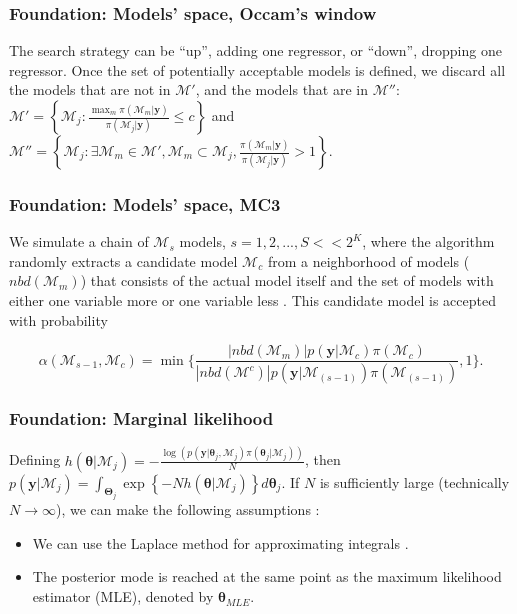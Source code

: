 \documentclass[12pt, compress]{beamer}
\begin{document}
\begin{frame}
	\frametitle{Foundation: Models' space, Occam's window}
The search strategy can be ``up'', adding one regressor, or ``down'', dropping one regressor. Once the set of potentially acceptable models is defined, we discard all the models that are not in $\mathcal{M}'$, and the models that are in $\mathcal{M}''$:
$\mathcal{M}'=\left\{\mathcal{M}_j:\frac{\max_m {\pi(\mathcal{M}_m|\bm{y})}}{\pi(\mathcal{M}_j|\bm{y})}\leq c\right\}$ and $\mathcal{M}''=\left\{\mathcal{M}_j:\exists \mathcal{M}_m\in\mathcal{M}',\mathcal{M}_m\subset \mathcal{M}_j,\frac{\pi(\mathcal{M}_m|\bm{y})}{\pi(\mathcal{M}_j|\bm{y})}>1\right\}$.
\end{frame}

\begin{frame}
	\frametitle{Foundation: Models' space, MC3}
We simulate a chain of $\mathcal{M}_s$ models, $s = 1, 2, ..., S<<2^K$, where the algorithm randomly extracts a candidate model $\mathcal{M}_c$ from a neighborhood of models ($nbd(\mathcal{M}_m)$) that consists of the actual model itself and the set of models with either one variable more or one variable less \citep{Raftery1997}. This candidate model is accepted with probability

\begin{equation*}
	\alpha (\mathcal{M}_{s-1},\mathcal{M}_{c})=\min \bigg \{ \frac{|nbd(\mathcal{M}_m)|p(\bm{y} | \mathcal{M}_c)\pi(\mathcal{M}_c)}{|nbd(\mathcal{M}^{c})|p(\bm{y}| \mathcal{M}_{(s-1)})\pi(\mathcal{M}_{(s-1)})},1 \bigg \}.
\end{equation*}
\end{frame}

\begin{frame}
	\frametitle{Foundation: Marginal likelihood}
Defining $h(\bm{\theta}|\mathcal{M}_j)=-\frac{\log(p(\bm{y}| \bm{\theta}_j,\mathcal{M}_j)\pi(\bm{\theta}_j | \mathcal{M}_j))}{N}$, then $p(\bm{y} | \mathcal{M}_j)=\int_{\bm{\Theta}_j} \exp\left\{-N h(\bm{\theta}|\mathcal{M}_j)\right\}  d\bm{\theta}_{j}$. If $N$ is sufficiently large (technically $N\to \infty$), we can make the following assumptions \citep{Hoeting1999}:

\begin{itemize}
	\item We can use the Laplace method for approximating integrals \citep{Tierney1986}.
	\item The posterior mode is reached at the same point as the maximum likelihood estimator (MLE), denoted by $\hat{\bm{\theta}}_{MLE}$.
\end{itemize}

\end{frame}
\end{document}
